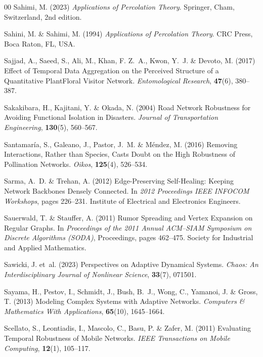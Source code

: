 \documentclass{comnet-mod}
\begin{document}
\begin{thebibliography}{00}
Sahimi, M. (2023) {\em {Applications of Percolation Theory}}.
Springer, {Cham, Switzerland}, 2nd edition.

Sahini, M. {\&} Sahimi, M. (1994) {\em {Applications of Percolation Theory}}.
{CRC Press}, {Boca Raton, FL, USA}.

Sajjad, A., Saeed, S., Ali, M., Khan, F. Z.~A., Kwon, Y.~J. {\&} Devoto, M.
  (2017)  {Effect of Temporal Data Aggregation on the Perceived Structure of a
  Quantitative Plant\textendash Floral Visitor Network}. {\em {Entomological
  Research}}, \textbf{47}(6), 380--387.

Sakakibara, H., Kajitani, Y. {\&} Okada, N. (2004)  {Road Network Robustness
  for Avoiding Functional Isolation in Disasters}. {\em {Journal of
  Transportation Engineering}}, \textbf{130}(5), 560--567.

Santamar{\'i}a, S., Galeano, J., Pastor, J.~M. {\&} M{\'e}ndez, M. (2016)
  {Removing Interactions, Rather than Species, Casts Doubt on the High
  Robustness of Pollination Networks}. {\em {Oikos}}, \textbf{125}(4),
  526--534.

Sarma, A.~D. {\&} Trehan, A. (2012)  {Edge-Preserving Self-Healing: Keeping
  Network Backbones Densely Connected}. In {\em {2012 {{Proceedings IEEE
  INFOCOM Workshops}}}}, pages 226--231. {Institute of Electrical and
  Electronics Engineers}.

Sauerwald, T. {\&} Stauffer, A. (2011)  {Rumor {{Spreading}} and {{Vertex
  Expansion}} on {{Regular Graphs}}}. In {\em {Proceedings of the 2011 {{Annual
  ACM--SIAM Symposium}} on {{Discrete Algorithms}} ({{SODA}})}}, Proceedings,
  pages 462--475. {Society for Industrial and Applied Mathematics}.

Sawicki, J.  et~al. (2023)  Perspectives on Adaptive Dynamical Systems. {\em
  Chaos: An Interdisciplinary Journal of Nonlinear Science}, \textbf{33}(7),
  071501.

Sayama, H., Pestov, I., Schmidt, J., Bush, B.~J., Wong, C., Yamanoi, J. {\&}
  Gross, T. (2013)  {Modeling Complex Systems with Adaptive Networks}. {\em
  {Computers \& Mathematics With Applications}}, \textbf{65}(10), 1645--1664.

Scellato, S., Leontiadis, I., Mascolo, C., Basu, P. {\&} Zafer, M. (2011)
  {Evaluating Temporal Robustness of Mobile Networks}. {\em {IEEE Transactions
  on Mobile Computing}}, \textbf{12}(1), 105--117.


\end{thebibliography}
\end{document}
